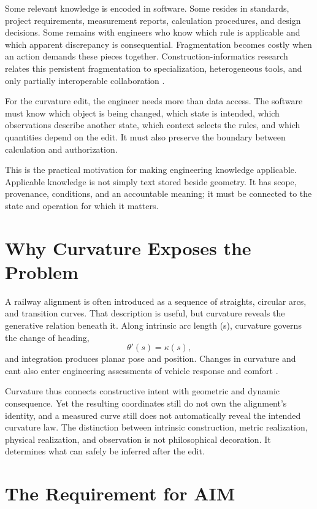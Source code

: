 Some relevant knowledge is encoded in software. Some resides in standards,
project requirements, measurement reports, calculation procedures, and design
decisions. Some remains with engineers who know which rule is applicable and
which apparent discrepancy is consequential. Fragmentation becomes costly when
an action demands these pieces together. Construction-informatics research
relates this persistent fragmentation to specialization, heterogeneous tools,
and only partially interoperable collaboration \cite{Turk2020Interoperability}.

For the curvature edit, the engineer needs more than data access. The software
must know which object is being changed, which state is intended, which
observations describe another state, which context selects the rules, and which
quantities depend on the edit. It must also preserve the boundary between
calculation and authorization.

This is the practical motivation for making engineering knowledge applicable.
Applicable knowledge is not simply text stored beside geometry. It has scope,
provenance, conditions, and an accountable meaning; it must be connected to the
state and operation for which it matters.

\section{Why Curvature Exposes the Problem}

A railway alignment is often introduced as a sequence of straights, circular
arcs, and transition curves. That description is useful, but curvature reveals
the generative relation beneath it. Along intrinsic arc length (s), curvature
governs the change of heading,
\[
  \theta'(s)=\kappa(s),
\]
and integration produces planar pose and position. Changes in curvature and
cant also enter engineering assessments of vehicle response and comfort
\cite{Kufver2000RailwayAlignment,BrustadDalmo2020Review}.

Curvature thus connects constructive intent with geometric and dynamic
consequence. Yet the resulting coordinates still do not own the alignment's
identity, and a measured curve still does not automatically reveal the intended
curvature law. The distinction between intrinsic construction, metric
realization, physical realization, and observation is not philosophical
decoration. It determines what can safely be inferred after the edit.

\section{The Requirement for AIM}


